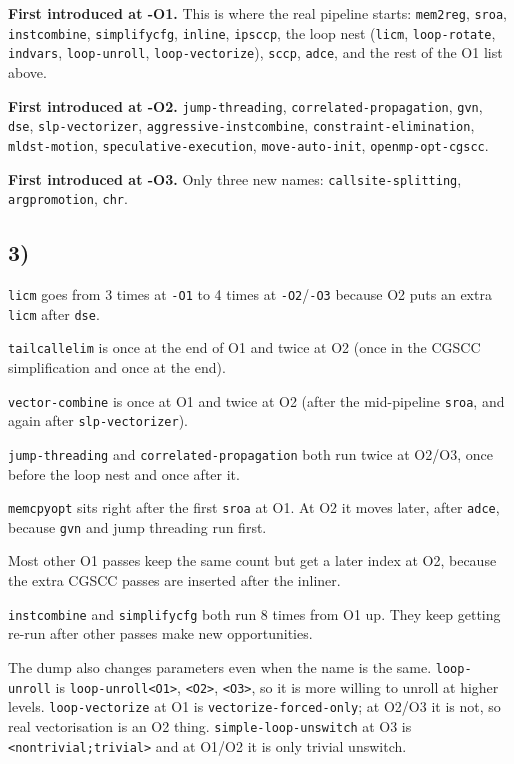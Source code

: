 \documentclass[11pt,a4paper]{article}
\begin{document}
\textbf{First introduced at -O1.} This is where the real pipeline starts:
\texttt{mem2reg}, \texttt{sroa}, \texttt{instcombine}, \texttt{simplifycfg},
\texttt{inline}, \texttt{ipsccp}, the loop nest (\texttt{licm},
\texttt{loop-rotate}, \texttt{indvars}, \texttt{loop-unroll},
\texttt{loop-vectorize}), \texttt{sccp}, \texttt{adce}, and the rest of the
O1 list above.

\textbf{First introduced at -O2.}
\texttt{jump-threading}, \texttt{correlated-propagation}, \texttt{gvn},
\texttt{dse}, \texttt{slp-vectorizer}, \texttt{aggressive-instcombine},
\texttt{constraint-elimination}, \texttt{mldst-motion},
\texttt{speculative-execution}, \texttt{move-auto-init},
\texttt{openmp-opt-cgscc}.

\textbf{First introduced at -O3.} Only three new names:
\texttt{callsite-splitting}, \texttt{argpromotion}, \texttt{chr}.

\subsection*{3)}

\texttt{licm} goes from 3 times at \texttt{-O1} to 4 times at
\texttt{-O2}/\texttt{-O3} because O2 puts an extra \texttt{licm} after
\texttt{dse}.

\texttt{tailcallelim} is once at the end of O1 and twice at O2 (once in the
CGSCC simplification and once at the end).

\texttt{vector-combine} is once at O1 and twice at O2 (after the mid-pipeline
\texttt{sroa}, and again after \texttt{slp-vectorizer}).

\texttt{jump-threading} and \texttt{correlated-propagation} both run twice at
O2/O3, once before the loop nest and once after it.

\texttt{memcpyopt} sits right after the first \texttt{sroa} at O1. At O2 it
moves later, after \texttt{adce}, because \texttt{gvn} and jump threading run
first.

Most other O1 passes keep the same count but get a later index at O2, because
the extra CGSCC passes are inserted after the inliner.

\texttt{instcombine} and \texttt{simplifycfg} both run 8 times from O1 up.
They keep getting re-run after other passes make new opportunities.

The dump also changes parameters even when the name is the same.
\texttt{loop-unroll} is \texttt{loop-unroll<O1>}, \texttt{<O2>}, \texttt{<O3>},
so it is more willing to unroll at higher levels.
\texttt{loop-vectorize} at O1 is \texttt{vectorize-forced-only}; at O2/O3 it
is not, so real vectorisation is an O2 thing.
\texttt{simple-loop-unswitch} at O3 is \texttt{<nontrivial;trivial>} and at
O1/O2 it is only trivial unswitch.
\end{document}
